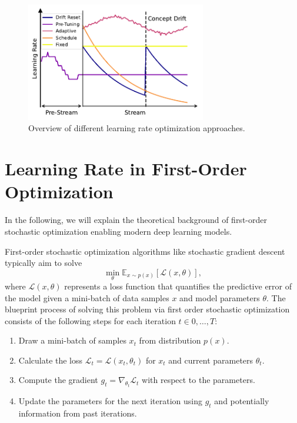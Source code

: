 \documentclass[runningheads]{llncs}
\begin{document}
\begin{figure}
	\centering
	\includegraphics[width=0.7\textwidth]{figures/lr_overview.pdf}
	\caption{Overview of different learning rate optimization approaches.}
	\label{fig:lr_overview}
\end{figure}

\section{Learning Rate in First-Order Optimization}

In the following, we will explain the theoretical background of first-order stochastic optimization enabling modern deep learning models.

First-order stochastic optimization algorithms like stochastic gradient descent typically aim to solve
\begin{equation}
	\min_{\theta} \mathbb{E}_{x \sim p(x)} [\mathcal{L}(x, \theta)],
\end{equation}
where $\mathcal{L}(x, \theta)$ represents a loss function that quantifies the predictive error of the model given a mini-batch of data samples $x$ and model parameters $\theta$.
The blueprint process of solving this problem via first order stochastic optimization consists of the following steps for each iteration $t \in 0, \ldots, T$:
\begin{enumerate}
	\item Draw a mini-batch of samples $x_t$ from distribution $p(x)$.
	\item Calculate the loss $\mathcal{L}_t = \mathcal{L}(x_t, \theta_t)$ for $x_t$ and current parameters $\theta_t$.
	\item Compute the gradient $g_t = \nabla_{\theta_t} \mathcal{L}_t$ with respect to the parameters.
	\item Update the parameters for the next iteration using $g_t$ and potentially information from past iterations.
\end{enumerate}
\end{document}
